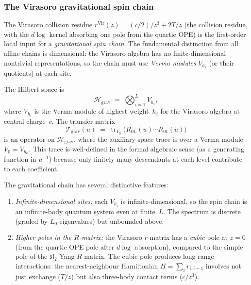 \subsubsection{The Virasoro gravitational spin chain}

\begin{construction}
\label{constr:virasoro-spin-chain}
%
%
%
The Virasoro collision residue $r^{\mathrm{Vir}}(z)
= (c/2)/z^3 + 2T/z$ (the collision residue, with the
$d\log$ kernel absorbing one pole from the quartic OPE)
is the first-order local input for a \emph{gravitational spin chain}.
The fundamental
distinction from all affine chains is dimensional: the
Virasoro algebra has no finite-dimensional nontrivial
representations, so the chain must use \emph{Verma modules}
$V_{h_i}$ (or their quotients) at each site.

The Hilbert space is
\begin{equation}
\label{eq:virasoro-hilbert-space}
\mathcal{H}_{\mathrm{grav}}
\;=\;
\bigotimes_{i=1}^{L} V_{h_i},
\end{equation}
where $V_{h_i}$ is the Verma module of highest weight~$h_i$
for the Virasoro algebra at central charge~$c$. The transfer
matrix
\begin{equation}
\label{eq:virasoro-transfer-matrix}
\mathcal{T}_{\mathrm{grav}}(u)
\;=\;
\operatorname{tr}_{V_0}\!\bigl(
 R_{0L}(u) \cdots R_{01}(u)
\bigr)
\end{equation}
is an operator on $\mathcal{H}_{\mathrm{grav}}$, where
the auxiliary-space trace is over a Verma module $V_0 = V_{h_0}$.
This trace is well-defined in the formal algebraic sense
(as a generating function in $u^{-1}$) because only
finitely many descendants at each level contribute to
each coefficient.

The gravitational chain has several distinctive features:
\begin{enumerate}[label=\textup{(\roman*)}]
\item \emph{Infinite-dimensional sites:} each
 $V_{h_i}$ is infinite-dimensional, so the spin chain
 is an infinite-body quantum system even at finite~$L$.
 The spectrum is discrete (graded by $L_0$-eigenvalues)
 but unbounded above.

\item \emph{Higher poles in the $R$-matrix:}
 the Virasoro $r$-matrix has a \emph{cubic} pole at
 $z = 0$ (from the quartic OPE pole after $d\log$
 absorption), compared to the simple pole of the
 $\mathfrak{sl}_2$ Yang $R$-matrix. The cubic pole
 produces long-range interactions: the nearest-neighbour
 Hamiltonian $H = \sum_i r_{i,i+1}$ involves not just
 exchange ($T/z$) but also three-body contact terms
 ($c/z^3$).


\end{enumerate}
\end{construction}
